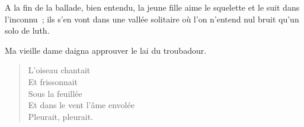 \documentclass[french,twoside]{book} %
\begin{document}
\noindent A la fin de la ballade, bien entendu, la jeune  fille aime le squelette et le suit dans l’inconnu ; ils s’en vont dans une vallée solitaire où l’on n’entend nul bruit qu’un solo de luth.\par
Ma vieille dame daigna approuver le lai du troubadour.\par


\begin{verse}
\hspace{1em}\hspace{1em}L’oiseau chantait\\
\hspace{1em}\hspace{1em}Et frissonnait\\
\hspace{1em}\hspace{1em}Sous la feuillée\\
Et dans le vent l’âme envolée\\
\hspace{1em}\hspace{1em}Pleurait, pleurait.\\
\end{verse}
\end{document}
